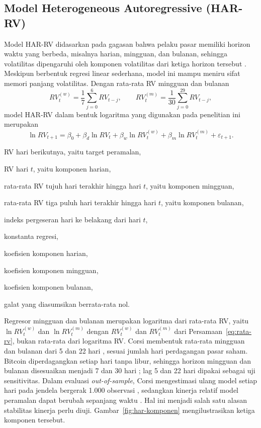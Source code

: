 \subsection{Model Heterogeneous Autoregressive (HAR-RV)}
Model HAR-RV didasarkan pada gagasan bahwa pelaku pasar memiliki horizon waktu
yang berbeda, misalnya harian, mingguan, dan bulanan, sehingga volatilitas
dipengaruhi oleh komponen volatilitas dari ketiga horizon tersebut
\cite{corsi2009}. Meskipun berbentuk regresi linear sederhana, model ini mampu
meniru sifat memori panjang volatilitas. Dengan rata-rata RV mingguan dan
bulanan
\begin{equation}
  RV_t^{(w)} = \frac{1}{7}\sum_{j=0}^{6} RV_{t-j},
  \qquad
  RV_t^{(m)} = \frac{1}{30}\sum_{j=0}^{29} RV_{t-j},
  \label{eq:rata-rv}
\end{equation}
model HAR-RV dalam bentuk logaritma yang digunakan pada penelitian ini
merupakan
\begin{equation}
  \ln RV_{t+1} = \beta_0 + \beta_d \ln RV_t + \beta_w \ln RV_t^{(w)}
  + \beta_m \ln RV_t^{(m)} + \varepsilon_{t+1}.
  \label{eq:har}
\end{equation}
\begin{keterangan}
  \item[$RV_{t+1}$] RV hari berikutnya, yaitu target peramalan,
  \item[$RV_t$] RV hari $t$, yaitu komponen harian,
  \item[$RV_t^{(w)}$] rata-rata RV tujuh hari terakhir hingga hari $t$,
    yaitu komponen mingguan,
  \item[$RV_t^{(m)}$] rata-rata RV tiga puluh hari terakhir hingga hari $t$,
    yaitu komponen bulanan,
  \item[$j$] indeks pergeseran hari ke belakang dari hari $t$,
  \item[$\beta_0$] konstanta regresi,
  \item[$\beta_d$] koefisien komponen harian,
  \item[$\beta_w$] koefisien komponen mingguan,
  \item[$\beta_m$] koefisien komponen bulanan,
  \item[$\varepsilon_{t+1}$] galat yang diasumsikan berrata-rata nol.
\end{keterangan}
Regresor mingguan dan bulanan merupakan logaritma dari rata-rata RV, yaitu
$\ln RV_t^{(w)}$ dan $\ln RV_t^{(m)}$ dengan $RV_t^{(w)}$ dan $RV_t^{(m)}$ dari
Persamaan~\eqref{eq:rata-rv}, bukan rata-rata dari logaritma RV.
Corsi membentuk rata-rata mingguan dan bulanan dari 5 dan 22 hari
\cite{corsi2009}, sesuai jumlah hari perdagangan pasar saham. Bitcoin
diperdagangkan setiap hari tanpa libur, sehingga horizon mingguan dan bulanan
disesuaikan menjadi 7 dan 30 hari \cite{qiu2025}; lag 5 dan 22 hari dipakai
sebagai uji sensitivitas. Dalam evaluasi \textit{out-of-sample}, Corsi
mengestimasi ulang model setiap hari pada jendela bergerak 1.000 observasi
\cite{corsi2009}, sedangkan kinerja relatif model peramalan dapat berubah
sepanjang waktu \cite{rossi2013}. Hal ini menjadi salah satu alasan
stabilitas kinerja perlu diuji. Gambar~\ref{fig:har-komponen}
mengilustrasikan ketiga komponen tersebut.

